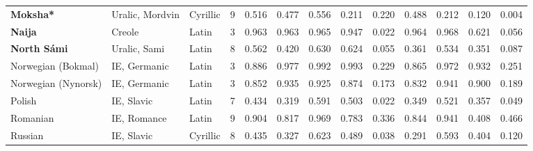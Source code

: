 \begin{tabular}{lllrrrrrrrrrr}
       \textbf{Moksha*} &                 Uralic, Mordvin &   Cyrillic &         9 &                       0.516 &                         0.477 &         0.556 &                  0.211 &            0.220 &                         0.488 &         0.212 &                  0.120 &            0.004 \\
         \textbf{Naija} &                          Creole &      Latin &         3 &                       0.963 &                         0.963 &         0.965 &                  0.947 &            0.022 &                         0.964 &         0.968 &                  0.621 &            0.056 \\
    \textbf{North Sámi} &                    Uralic, Sami &      Latin &         8 &                       0.562 &                         0.420 &         0.630 &                  0.624 &            0.055 &                         0.361 &         0.534 &                  0.351 &            0.087 \\
     Norwegian (Bokmal) &                    IE, Germanic &      Latin &         3 &                       0.886 &                         0.977 &         0.992 &                  0.993 &            0.229 &                         0.865 &         0.972 &                  0.932 &            0.251 \\
    Norwegian (Nynorsk) &                    IE, Germanic &      Latin &         3 &                       0.852 &                         0.935 &         0.925 &                  0.874 &            0.173 &                         0.832 &         0.941 &                  0.900 &            0.189 \\
                 Polish &                      IE, Slavic &      Latin &         7 &                       0.434 &                         0.319 &         0.591 &                  0.503 &            0.022 &                         0.349 &         0.521 &                  0.357 &            0.049 \\
               Romanian &                     IE, Romance &      Latin &         9 &                       0.904 &                         0.817 &         0.969 &                  0.783 &            0.336 &                         0.844 &         0.941 &                  0.408 &            0.466 \\
                Russian &                      IE, Slavic &   Cyrillic &         8 &                       0.435 &                         0.327 &         0.623 &                  0.489 &            0.038 &                         0.291 &         0.593 &                  0.404 &            0.120 \\

\end{tabular}
